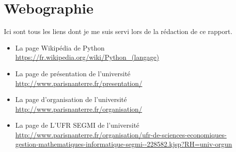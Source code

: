 \titleformat{\chapter}[display]
  {\normalfont\bfseries}{}{0pt}{\Large}

\chapter{Webographie}

Ici sont tous les liens dont je me suis servi lors de la rédaction de ce rapport.\\

\begin{itemize}
\item La page Wikipédia de Python \url{https://fr.wikipedia.org/wiki/Python_(langage)}
\item La page de présentation de l'université \url{http://www.parisnanterre.fr/presentation/}
\item La page d'organisation de l'université \url{http://www.parisnanterre.fr/organisation/}
\item La page de L'UFR SEGMI de l'université \url{http://www.parisnanterre.fr/organisation/ufr-de-sciences-economiques-gestion-mathematiques-informatique-segmi--228582.kjsp?RH=univ-orgun}
\end{itemize}